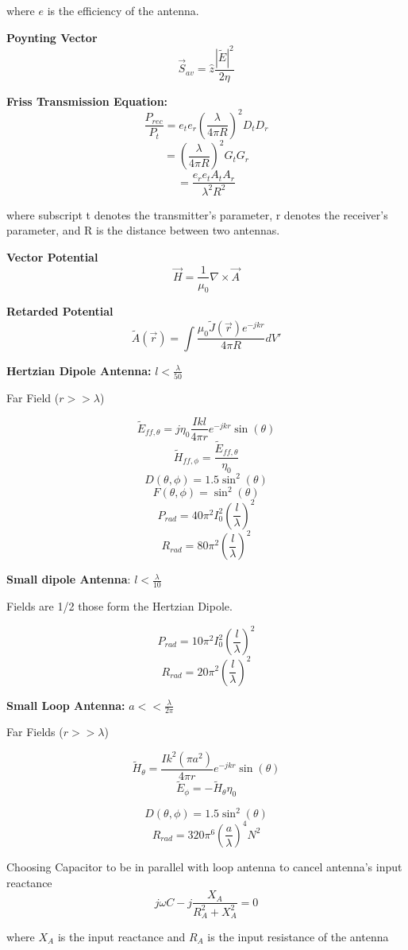 \documentclass{article} %
\begin{document}
\begin{center}
    where $e$ is the efficiency of the antenna.
\end{center}

\textbf{Poynting Vector}
\[\vec{S}_{av} = \hat{z}\frac{|\widetilde{E}|^2}{2 \eta}\]

\textbf{Friss Transmission Equation:}
\[\frac{P_{rec}}{P_t} = e_t e_r \left(\frac{\lambda}{4\pi R}\right)^2 D_t D_r\]
\[=\left(\frac{\lambda}{4\pi R}\right)^2 G_t G_r\]
\[=\frac{e_r e_t A_t A_r}{\lambda^2 R^2}\]

\begin{center}
    where subscript t denotes the transmitter's parameter, r denotes the receiver's parameter, and R is the distance between two antennas.
\end{center}

\textbf{Vector Potential}
\[\vec{H} = \frac{1}{\mu_0} \nabla \times \vec{A}\]

\textbf{Retarded Potential}
\[\widetilde{A}(\vec{r}) = \int \frac{\mu_0 \widetilde{J}(\vec{r})e^{-jkr}}{4\pi R} dV'\]



\textbf{Hertzian Dipole Antenna:}
$l < \frac{\lambda}{50}$

Far Field ($r >> \lambda$)

\[\widetilde{E}_{ff, \theta} = j \eta_0 \frac{I k l}{4 \pi r} e^{-jkr} \sin(\theta)\]
\[\widetilde{H}_{ff, \phi} = \frac{\widetilde{E}_{ff, \theta}}{\eta_0}\]
\[D(\theta, \phi) = 1.5 \sin^2(\theta)\]
\[F(\theta, \phi) = \sin^2(\theta)\]
\[P_{rad} = 40 \pi^2 I_0^2\left(\frac{l}{\lambda}\right)^2\]
\[R_{rad} = 80 \pi^2 \left(\frac{l}{\lambda}\right)^2\]

\textbf{Small dipole Antenna}: $l < \frac{\lambda}{10}$

Fields are 1/2 those form the Hertzian Dipole.

\[P_{rad} = 10 \pi^2 I_0^2\left(\frac{l}{\lambda}\right)^2\]
\[R_{rad} = 20 \pi^2 \left(\frac{l}{\lambda}\right)^2\]

\textbf{Small Loop Antenna:}
$a << \frac{\lambda}{2 \pi}$

Far Fields ($r >> \lambda$)

\[\widetilde{H}_{\theta} = \frac{I k^2 (\pi a^2) }{4 \pi r} e^{-jkr}\sin(\theta)\]
\[\widetilde{E}_{\phi} = -\widetilde{H}_{\theta} \eta_0\]

\[D(\theta, \phi) = 1.5 \sin^2(\theta)\]
\[R_{rad} = 320 \pi^6 \left(\frac{a}{\lambda}\right)^4 N^2\]

Choosing Capacitor to be in parallel with loop antenna to cancel antenna's input reactance
\[j\omega C - j \frac{X_A}{R_A^2 + X_A^2} = 0\]

\begin{center}
    where $X_A$ is the input reactance and $R_A$ is the input resistance of the antenna
\end{center}
\end{document}
